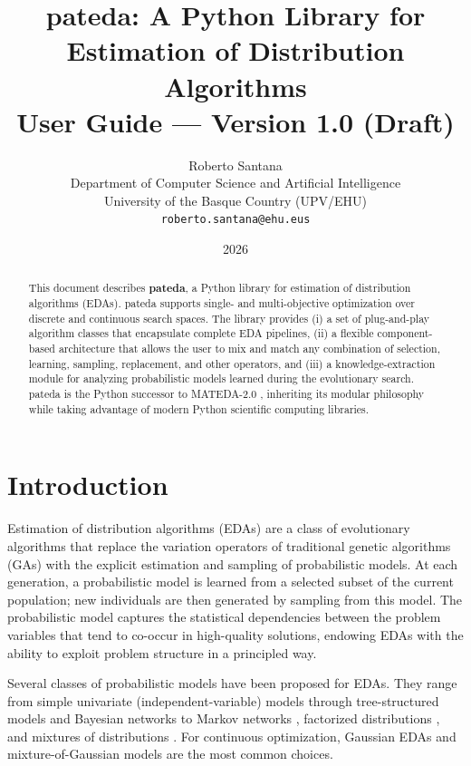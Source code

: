 \documentclass[a4paper,11pt]{article}
\title{%
  \textbf{pateda: A Python Library for Estimation of Distribution Algorithms}\\[0.5em]
  \large User Guide --- Version 1.0 (Draft)
}
\author{
  Roberto Santana\\
  Department of Computer Science and Artificial Intelligence\\
  University of the Basque Country (UPV/EHU)\\
  \texttt{roberto.santana@ehu.eus}
}
\date{2026}
\begin{document}
\maketitle

\begin{abstract}
This document describes \textbf{pateda}, a Python library for estimation of
distribution algorithms (EDAs). pateda supports single- and multi-objective
optimization over discrete and continuous search spaces. The library provides
(i) a set of plug-and-play algorithm classes that encapsulate complete EDA
pipelines, (ii) a flexible component-based architecture that allows the user to
mix and match any combination of selection, learning, sampling, replacement,
and other operators, and (iii) a knowledge-extraction module for analyzing
probabilistic models learned during the evolutionary search.  pateda is the
Python successor to MATEDA-2.0 \citep{Santana_et_al:2009b}, inheriting its
modular philosophy while taking advantage of modern Python scientific computing
libraries.
\end{abstract}

\tableofcontents
\newpage

\section{Introduction}

Estimation of distribution algorithms (EDAs)
\citep{Larranhaga_and_Lozano:2002,Lozano_et_al:2005,Muhlenbein_and_Paas:1996,Pelikan_et_al:2006}
are a class of evolutionary algorithms that replace the variation operators of
traditional genetic algorithms (GAs) \citep{Goldberg:1989,Holland:1975} with
the explicit estimation and sampling of probabilistic models.  At each
generation, a probabilistic model is learned from a selected subset of the
current population; new individuals are then generated by sampling from this
model.  The probabilistic model captures the statistical dependencies between
the problem variables that tend to co-occur in high-quality solutions, endowing
EDAs with the ability to exploit problem structure in a principled way.

Several classes of probabilistic models have been proposed for EDAs.  They
range from simple univariate (independent-variable) models
\citep{Muhlenbein_and_Paas:1996,Baluja:1994} through tree-structured models
\citep{Baluja_and_Davies:1997,Pelikan_and_Muhlenbein:1999} and Bayesian
networks \citep{Etxeberria_and_Larranhaga:1999,Pelikan_et_al:1999,Pelikan:2005}
to Markov networks
\citep{Santana:2003c,Santana:2005,Shakya_and_McCall:2007,Shakya_and_Santana:2008},
factorized distributions \citep{Muhlenbein_et_al:1999,Harik:1999}, and mixtures
of distributions \citep{Bosman_and_Thierens:2002}.  For continuous optimization,
Gaussian EDAs
\citep{Larranhaga_et_al:1999,Larranhaga_et_al:2000,Bosman_and_Thierens:2000,Bosman_and_Thierens:2000a}
and mixture-of-Gaussian models are the most common choices.
\end{document}
